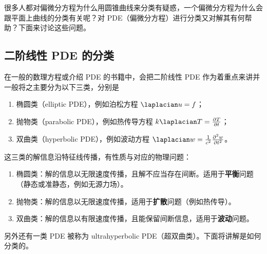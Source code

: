 很多人都对偏微分方程为什么用圆锥曲线来分类有疑惑，一个偏微分方程为什么会跟平面上曲线的分类有关呢？对 PDE（偏微分方程）进行分类又对解其有何帮助？下面来讨论这些问题。

\subsection{二阶线性 PDE 的分类}
在一般的数理方程或介绍 PDE 的书籍中，会把二阶线性 PDE 作为着重点来讲并一般将之主要分为以下三类，分别是
\begin{enumerate}
\item 椭圆类（elliptic PDE），例如泊松方程 $\laplacian u = f$；
\item 抛物类（parabolic PDE），例如热传导方程 $k \laplacian T = \frac{\partial T}{\partial t}$；
\item 双曲类（hyperbolic PDE），例如波动方程 $\laplacian w = \frac{1}{c^2} \frac{\partial^2 w}{\partial t^2}$。
\end{enumerate}
这三类的解信息沿特征线传播，有性质与对应的物理问题：
\begin{enumerate}
\item 椭圆类：解的信息以无限速度传播，且解不应当存在间断。适用于\textbf{平衡}问题（静态或准静态，例如无源力场）。
\item 抛物类：解的信息以无限速度传播，适用于\textbf{扩散}问题（例如热传导）。
\item 双曲类：解的信息以有限速度传播，且能保留间断信息，适用于\textbf{波动}问题。
\end{enumerate}
另外还有一类 PDE 被称为 ultrahyperbolic PDE（超双曲类）。下面将讲解是如何分类的。

